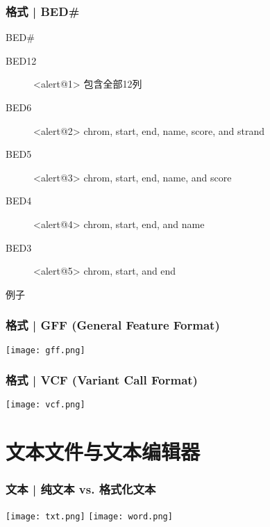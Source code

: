 \begin{frame}
  \frametitle{格式 | \alert{BED\#}}
  \begin{block}{BED\#}
  \begin{description}
    \item[BED12]<alert@1> 包含全部12列
    \item[BED6]<alert@2> \alert{chrom, start, end, name, score, and strand}
    \item[BED5]<alert@3> chrom, start, end, name, and score
    \item[BED4]<alert@4> chrom, start, end, and name
    \item[BED3]<alert@5> chrom, start, and end
  \end{description}
\end{block}
\begin{block}{例子}
  \end{block}
\end{frame}

\begin{frame}
  \frametitle{格式 | GFF (General Feature Format)}
    \begin{center}
      \texttt{[image: gff.png]}
    \end{center}
\end{frame}

\begin{frame}
  \frametitle{格式 | VCF (Variant Call Format)}
    \begin{center}
      \texttt{[image: vcf.png]}
    \end{center}
\end{frame}

\section{文本文件与文本编辑器}
\begin{frame}
  \frametitle{文本 | 纯文本 vs. 格式化文本}
    \begin{center}
      \texttt{[image: txt.png]}
      \vspace*{0.1cm}
      \texttt{[image: word.png]}
    \end{center}
\end{frame}

